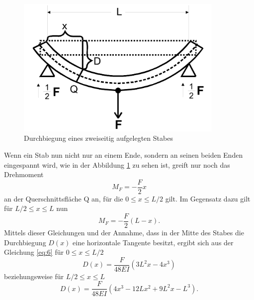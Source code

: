 \begin{figure}[h]
    \centering
    \includegraphics[width=10cm]{Theorie5.png}
    \caption{Durchbiegung eines zweiseitig aufgelegten Stabes}
    \label{fig:theorie5}
\end{figure}    
\noindent
Wenn ein Stab nun nicht nur an einem Ende, sondern
an seinen beiden Enden eingespannt wird, wie in 
der Abbildung \ref{fig:theorie5} zu sehen ist, greift nur 
noch das Drehmoment 
\begin{equation}
    M_{F} = -\frac{F}{2}x
    \label{eq:9}
\end{equation}
\noindent an der Querschnittsfläche Q an, für die
$0 \leq x \leq L/2$ gilt. Im Gegensatz dazu gilt für 
$L/2 \leq x \leq L$ nun 
\begin{equation}
    M_{F} = -\frac{F}{2}(L-x).
    \label{eq:10}
\end{equation}
Mittels dieser Gleichungen und der Annahme, dass 
in der Mitte des Stabes die Durchbiegung $D(x)$ eine
horizontale Tangente besitzt, ergibt sich aus der Gleichung
\ref{eq:6}
für $0 \leq x \leq L/2$
\begin{equation}
    D(x) = \frac{F}{48 E I} \left( 3 L^2 x - 4 x^3 \right)
    \label{eq:11}
\end{equation}
\noindent beziehungsweise für $L/2 \leq x \leq L$
\begin{equation}
    D(x) = \frac{F}{48 E I} \left( 4 x^3 - 12 L x^2 + 9 L^2 x - L^3 \right).
    \label{eq:12}
\end{equation}
